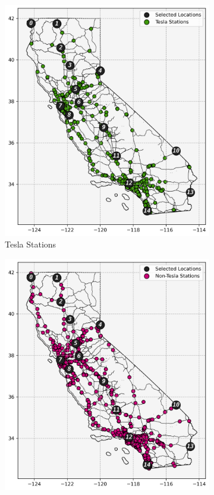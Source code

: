 \documentclass[11pt]{article}
\begin{document}
\begin{figure}[H]
	\begin{subfigure}{\linewidth/3}
		\centering
		\includegraphics[width = \linewidth]{figs/California_SNG_T.png}
		\caption{Tesla Stations}
	\end{subfigure}%
	\begin{subfigure}{\linewidth/3}
		\centering
		\includegraphics[width = \linewidth]{figs/California_SNG_NT.png}

\end{subfigure}
\end{figure}
\end{document}
